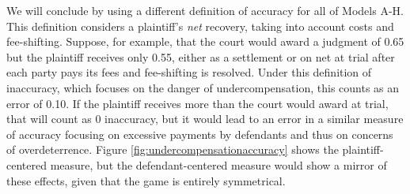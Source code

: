 \documentclass{article}
\begin{document}
We will conclude by using a different definition of accuracy for all of Models A-H. This definition considers a plaintiff's \textit{net} recovery, taking into account costs and fee-shifting. Suppose, for example, that the court would award a judgment of 0.65 but the plaintiff receives only 0.55, either as a settlement or on net at trial after each party pays its fees and fee-shifting is resolved. Under this definition of inaccuracy, which focuses on the danger of undercompensation, this counts as an error of 0.10. If the plaintiff receives more than the court would award at trial, that will count as 0 inaccuracy, but it would lead to an error in a similar measure of accuracy focusing on excessive payments by defendants and thus on concerns of overdeterrence. Figure \ref{fig:undercompensationaccuracy} shows the plaintiff-centered measure, but the defendant-centered measure would show a mirror of these effects, given that the game is entirely symmetrical. 
\end{document}
